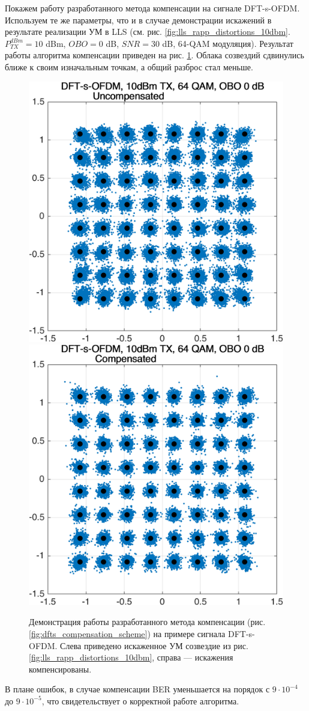 Покажем работу разработанного метода компенсации на сигнале DFT-s-OFDM.
Используем те же параметры, что и в случае демонстрации искажений в
результате реализации УМ в LLS (см. рис.
\ref{fig:lls_rapp_distortions_10dbm}. $P^{dBm}_{TX} = 10$ dBm, $OBO = 0$
dB, $SNR=30$ dB, 64-QAM модуляция). Результат работы алгоритма компенсации
приведен на рис. \ref{fig:dfts_lls_compensation_10dbm}. Облака созвездий
сдвинулись ближе к своим изначальным точкам, а общий разброс стал меньше.

\begin{figure}[h!]
    \centering
    \includegraphics[width=0.45\linewidth]{figs/dfts_10dbm_obo0_uncompensated.png}
    \includegraphics[width=0.45\linewidth]{figs/dfts_10dbm_obo0_compensated.png}
    \caption{Демонстрация работы разработанного метода компенсации (рис.
    \ref{fig:dfts_compensation_scheme}) на примере сигнала DFT-s-OFDM.
    Слева приведено искаженное УМ созвездие из рис.
    \ref{fig:lls_rapp_distortions_10dbm}, справа — искажения
    компенсированы.}
    \label{fig:dfts_lls_compensation_10dbm}
\end{figure}

В плане ошибок, в случае компенсации BER уменьшается на порядок с $9\cdot
10^{-4}$ до $9\cdot 10^{-5}$, что свидетельствует о корректной работе
алгоритма.



